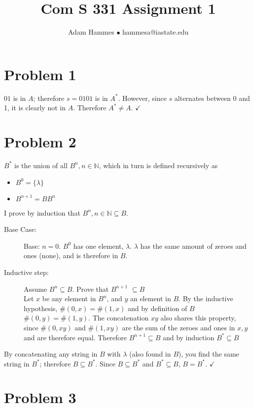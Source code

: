 \documentclass[11pt]{article}
\begin{document}
\title{Com S 331 Assignment 1}
\author{Adam Hammes $\bullet$ hammesa@iastate.edu}
\maketitle

\section*{Problem 1}

$01$ is in $A$; therefore $s = 0101$ is in $A^*$. However, since $s$ alternates between 0 and 1, it is clearly not in $A$. Therefore $A^* \neq A$. $\checkmark$

\section*{Problem 2}
$B^*$ is  the union of all $B^n, n \in \mathbb{N}$, which in turn is defined recursively as
	\begin{itemize}
		\item 		$B^0	= \{\lambda\}$
		\item		$B^{n+1}	 = BB^n$
	\end{itemize}
I prove by induction that $B^n, n \in \mathbb{N} \subseteq B$.

\begin{description}
	\item[Base Case:] Base: $n = 0$. $B^0$ has one element, $\lambda$. $\lambda$ has the same amount of zeroes and ones (none), and is therefore in $B$.
	
	\item[Inductive step:] Assume $B^n \subseteq B$. Prove that $B^{n+1}$ $\subseteq B$\\
	Let $x$ be any element in $B^n$, and $y$ an element in $B$. By the inductive hypothesis, $\#(0,x) =\#(1,x)$ and by definition of $B$ $\#(0,y) = \#(1,y)$. The concatenation $xy$ also shares this property, since $\#(0,xy)$ and $\#(1, xy)$ are the sum of the zeroes and ones in $x,y$ and are therefore equal. Therefore $B^{n+1} \subseteq B$ and by induction $B^* \subseteq B$
\end{description}
By concatenating any string in $B$ with $\lambda$ (also found in $B$), you find the same string in $B^*$; therefore $B \subseteq B^*$. Since $B \subseteq B^*$ and $B^* \subseteq B$, $B = B^*$. $\checkmark$

\section*{Problem 3}
\end{document}

